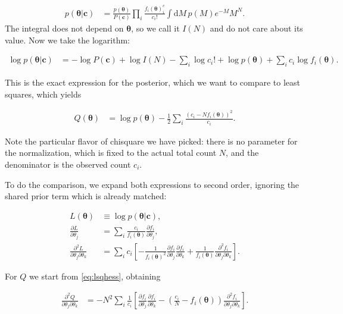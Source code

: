 \begin{align}
    p(\boldsymbol\theta|\mathbf c)
    &= \frac {p(\boldsymbol\theta)} {P(\mathbf c)}
    \prod_i
    \frac {f_i(\boldsymbol\theta)^c_i} {c_i!}
    \int \mathrm dM\, p(M) e^{-M} M^N.
\end{align}
%
The integral does not depend on $\boldsymbol\theta$, so we call it $I(N)$ and
do not care about its value. Now we take the logarithm:

\begin{align}
    \log p(\boldsymbol\theta|\mathbf c) &=
    -\log P(\mathbf c) + \log I(N) - \sum_i \log c_i!
    + \log p(\boldsymbol\theta) + \sum_i c_i \log f_i(\boldsymbol\theta).
\end{align}

This is the exact expression for the posterior, which we want to compare to
least squares, which yields

\begin{align}
    Q(\boldsymbol\theta) &=
    \log p(\boldsymbol\theta)
    -\frac 12
    \sum_i \frac {(c_i - N f_i(\boldsymbol\theta))^2} {c_i}.
\end{align}

Note the particular flavor of chisquare we have picked: there is no parameter
for the normalization, which is fixed to the actual total count $N$, and the
denominator is the observed count $c_i$.

To do the comparison, we expand both expressions to second order, ignoring the
shared prior term which is already matched:

\begin{align}
    L(\boldsymbol\theta) &\equiv \log p(\boldsymbol\theta|\mathbf c), \\
    \frac {\partial L} {\partial\theta_j} &=
    \sum_i \frac {c_i} {f_i(\boldsymbol\theta)}
    \frac {\partial f_i} {\partial \theta_j}, \\
    \frac {\partial^2 L} {\partial\theta_j \partial\theta_k} &=
    \sum_i c_i \left[
    -\frac 1 {f_i(\boldsymbol\theta)^2}
    \frac {\partial f_i} {\partial \theta_j}
    \frac {\partial f_i} {\partial \theta_k}
    + \frac 1 {f_i(\boldsymbol\theta)}
    \frac {\partial^2 f_i} {\partial\theta_j \partial\theta_k}
    \right].
\end{align}

For $Q$ we start from \eqref{eq:lsqhess}, obtaining

\begin{align}
    \frac {\partial^2 Q} {\partial\theta_j \partial\theta_k} &=
    -N^2 \sum_i
    \frac 1 {c_i} \left[
    \frac {\partial f_i} {\partial \theta_j}
    \frac {\partial f_i} {\partial \theta_k}
    - \left( \frac{c_i} N - f_i(\boldsymbol\theta) \right)
    \frac {\partial^2 f_i} {\partial\theta_j \partial\theta_k}
    \right]. \label{eq:Qjk}
\end{align}

